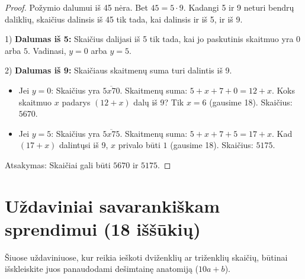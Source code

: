 \documentclass[11pt,a4paper]{scrartcl}
\begin{document}
\begin{proof}
Požymio dalumui iš 45 nėra. Bet $45 = 5 \cdot 9$. Kadangi 5 ir 9 neturi bendrų daliklių, skaičius dalinsis iš 45 tik tada, kai dalinsis ir iš 5, ir iš 9.

1) \textbf{Dalumas iš 5:} Skaičius dalijasi iš 5 tik tada, kai jo paskutinis skaitmuo yra $0$ arba $5$. Vadinasi, $y = 0$ arba $y = 5$.

2) \textbf{Dalumas iš 9:} Skaičiaus skaitmenų suma turi dalintis iš 9.
\begin{itemize}
    \item Jei $y = 0$: Skaičius yra $\overline{5x70}$. Skaitmenų suma: $5+x+7+0 = 12+x$. Koks skaitmuo $x$ padarys $(12+x)$ dalų iš 9? Tik $x=6$ (gausime 18). Skaičius: $5670$.
    \item Jei $y = 5$: Skaičius yra $\overline{5x75}$. Skaitmenų suma: $5+x+7+5 = 17+x$. Kad $(17+x)$ dalintųsi iš 9, $x$ privalo būti $1$ (gausime 18). Skaičius: $5175$.
\end{itemize}
Atsakymas: Skaičiai gali būti $5670$ ir $5175$.
\end{proof}

\vspace{1cm}

\newpage
\section{Uždaviniai savarankiškam sprendimui (18 iššūkių)}

Šiuose uždaviniuose, kur reikia ieškoti dviženklių ar triženklių skaičių, būtinai išskleiskite juos panaudodami dešimtainę anatomiją ($10a+b$).
\end{document}
